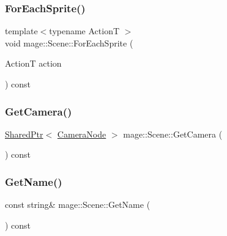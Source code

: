 \hypertarget{classmage_1_1_scene_ae181b160f9a75593db9f551c9c233329}{}\label{classmage_1_1_scene_ae181b160f9a75593db9f551c9c233329} 
\subsubsection{\texorpdfstring{For\+Each\+Sprite()}{ForEachSprite()}}
{\footnotesize\ttfamily template$<$typename ActionT $>$ \\
void mage\+::\+Scene\+::\+For\+Each\+Sprite (\begin{DoxyParamCaption}\item[{ActionT}]{action }\end{DoxyParamCaption}) const}

\hypertarget{classmage_1_1_scene_a4ce734c571a4ac2fc564cf1c641e7820}{}\label{classmage_1_1_scene_a4ce734c571a4ac2fc564cf1c641e7820} 
\subsubsection{\texorpdfstring{Get\+Camera()}{GetCamera()}}
{\footnotesize\ttfamily \hyperlink{namespacemage_a1e01ae66713838a7a67d30e44c67703e}{Shared\+Ptr}$<$ \hyperlink{classmage_1_1_camera_node}{Camera\+Node} $>$ mage\+::\+Scene\+::\+Get\+Camera (\begin{DoxyParamCaption}{ }\end{DoxyParamCaption}) const}

\hypertarget{classmage_1_1_scene_a251ff8f6ce0da5c55ee31e3450b5fb9a}{}\label{classmage_1_1_scene_a251ff8f6ce0da5c55ee31e3450b5fb9a} 
\subsubsection{\texorpdfstring{Get\+Name()}{GetName()}}
{\footnotesize\ttfamily const string\& mage\+::\+Scene\+::\+Get\+Name (\begin{DoxyParamCaption}{ }\end{DoxyParamCaption}) const}

\hypertarget{classmage_1_1_scene_a799ac8ddd90d24f6c3c208942e4f159c}{}\label{classmage_1_1_scene_a799ac8ddd90d24f6c3c208942e4f159c} 
